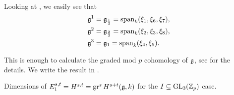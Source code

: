 Looking at , we easily see that
\begin{align*}
  \mathfrak{g}^{1} &= \mathfrak{g}_{\frac{1}{3}} = \operatorname{span}_{k}(\xi_{1},\xi_{6},\xi_{7}), \\
  \mathfrak{g}^{2} &= \mathfrak{g}_{\frac{2}{3}} = \operatorname{span}_{k}(\xi_{2},\xi_{3},\xi_{8}), \\
  \mathfrak{g}^{3} &= \mathfrak{g}_{1} = \operatorname{span}_{k}(\xi_{4},\xi_{5}).
\end{align*}

This is enough to calculate the graded mod $p$ cohomology of $\mathfrak{g}$, see \cite{code} for the details. We write the result in .

\begin{table}[ht]
  \centering
  \caption[Graded cohomology dimensions for the $I \subseteq \GL_{3}(\Z_{p})$ case]{Dimensions of $E_{1}^{s,t} = H^{s,t} = \operatorname{gr}^{s} H^{s+t}(\mathfrak{g},k)$ for the $I \subseteq \GL_{3}(\Z_{p})$ case.}
  \label{tab:graded-coh-dims-GL3}
  \renewcommand{\arraystretch}{1.7}
  \renewcommand{\arraystretch}{1}
\end{table}

